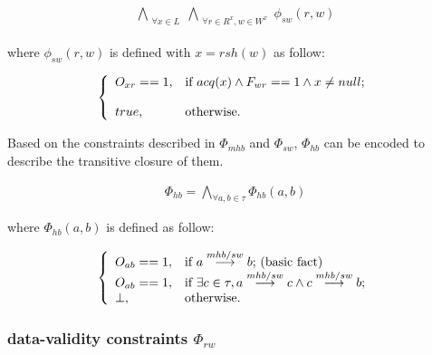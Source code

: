 \documentclass[preprint, numbers, 10pt]{sigplanconf}
\begin{document}

\begin{equation}
\begin{aligned}
\bigwedge_{\substack{\forall x\in L}}\bigwedge_{\substack{\forall r\in R^x, w\in W^x}}\phi_{sw}(r,w)
\end{aligned}
\end{equation}

where $\phi_{sw}(r,w)$ is defined with $x=rsh(w)$ as follow: 

\[ \left\{
  \begin{array}{l l}
    O_{xr}==1,           &  {\text{if $acq(x)\wedge F_{wr}==1\wedge x\neq null$}};\\\\
    true,  &  \text{otherwise}.
  \end{array} \right.\]

Based on the constraints described in $\Phi_{mhb}$ and $\Phi_{sw}$, 
$\Phi_{hb}$ can be encoded to describe the transitive closure of them. 

\begin{equation}
\begin{aligned}
\Phi_{hb} = \bigwedge_{\forall a,b\in \tau} \Phi_{hb}(a,b)
\end{aligned}
\end{equation}

where $\Phi_{hb}(a,b)$ is defined as follow: 

\[ \left\{
  \begin{array}{l l}
    O_{ab}==1,           &  {\text{if $a \stackrel{mhb/sw}{\longrightarrow} b$; (basic fact)}}\\
    O_{ab}==1,			   &  {\text{if $\exists c\in \tau, a \stackrel{mhb/sw}{\longrightarrow} c\wedge c \stackrel{mhb/sw}{\longrightarrow} b$}};\\
    \bot,  &  \text{otherwise}.
  \end{array} \right.\]

\subsubsection{data-validity constraints $\Phi_{rw}$}
\end{document}
